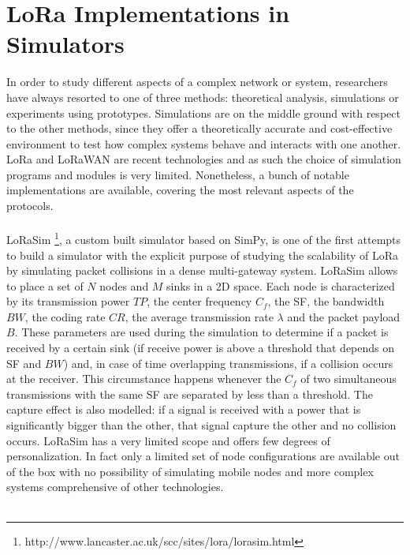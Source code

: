 \section{LoRa Implementations in Simulators}

In order to study different aspects of a complex network or system, researchers have always resorted to one of three methods: theoretical analysis, simulations or experiments using prototypes. Simulations are on the middle ground with respect to the other methods, since they offer a theoretically accurate and cost-effective environment to test how complex systems behave and interacts with one another. LoRa and LoRaWAN are recent technologies and as such the choice of simulation programs and modules is very limited. Nonetheless, a bunch of notable implementations are available, covering the most relevant aspects of the protocols. \\\\
LoRaSim \footnote{http://www.lancaster.ac.uk/scc/sites/lora/lorasim.html}, a custom built simulator based on SimPy, is one of the first attempts to build a simulator with the explicit purpose of studying the scalability of LoRa by simulating packet collisions in a dense multi-gateway system. LoRaSim allows to place a set of $N$ nodes and $M$ sinks in a 2D space. Each node is characterized by its transmission power $TP$, the center frequency $C_f$, the \gls{SF}, the bandwidth $BW$, the coding rate $CR$, the average transmission rate $\lambda$ and the packet payload $B$. These parameters are used during the simulation to determine if a packet is received by a certain sink (if receive power is above a threshold that depends on \gls{SF} and $BW$) and, in case of time overlapping transmissions, if a collision occurs at the receiver. This circumstance happens whenever the $C_f$ of two simultaneous transmissions with the same \gls{SF} are separated by less than a threshold. The capture effect is also modelled: if a signal is received with a power that is significantly bigger than the other, that signal capture the other and no collision occurs. LoRaSim has a very limited scope and offers few degrees of personalization. In fact only a limited set of node configurations are available out of the box with no possibility of simulating mobile nodes and more complex systems comprehensive of other technologies. \\ \\
